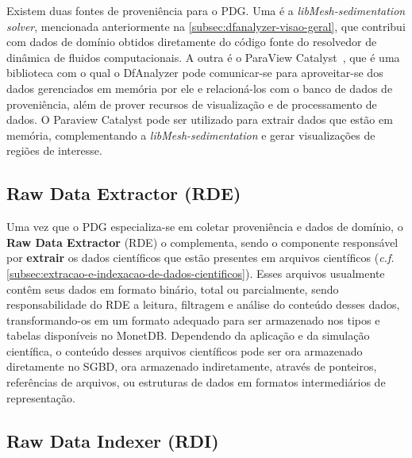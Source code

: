 Existem duas fontes de proveniência para o PDG. Uma é a \textit{libMesh-sedimentation solver}, mencionada anteriormente na \autoref{subsec:dfanalyzer-visao-geral}, que contribui com dados de domínio obtidos diretamente do código fonte do resolvedor de dinâmica de fluidos computacionais. A outra é o ParaView Catalyst~\cite{ayachit2015paraview}, que é uma biblioteca com o qual o DfAnalyzer pode comunicar-se para aproveitar-se dos dados gerenciados em memória por ele e relacioná-los com o banco de dados de proveniência, além de prover recursos de visualização e de processamento de dados. O Paraview Catalyst pode ser utilizado para extrair dados que estão em memória, complementando a \textit{libMesh-sedimentation} e gerar visualizações de regiões de interesse.

\subsection{Raw Data Extractor (RDE)}

Uma vez que o PDG especializa-se em coletar proveniência e dados de domínio, o \textbf{Raw Data Extractor} (RDE) o complementa, sendo o componente responsável por \textbf{extrair} os dados científicos que estão presentes em arquivos científicos (\textit{c.f.} \autoref{subsec:extracao-e-indexacao-de-dados-cientificos}). Esses arquivos usualmente contêm seus dados em formato binário, total ou parcialmente, sendo responsabilidade do RDE a leitura, filtragem e análise do conteúdo desses dados, transformando-os em um formato adequado para ser armazenado nos tipos e tabelas disponíveis no MonetDB. Dependendo da aplicação e da simulação científica, o conteúdo desses arquivos científicos pode ser ora armazenado diretamente no SGBD, ora armazenado indiretamente, através de ponteiros, referências de arquivos, ou estruturas de dados em formatos intermediários de representação.


\subsection{Raw Data Indexer (RDI)}

